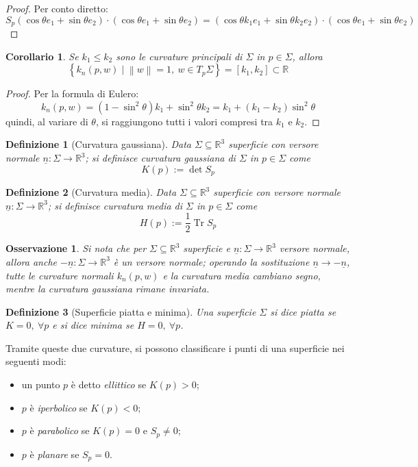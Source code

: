 \documentclass[12pt]{scrartcl}
\theoremstyle{style}
\newtheorem{definizione}{Definizione}[section]
\newtheorem{corollario}{Corollario}[teorema]
\newtheorem{osservazione}{Osservazione}[section]
\numberwithin{equation}{subsection}
\begin{document}
\begin{proof}
	Per conto diretto:
	\[
	S_p (\cos \theta  e_1 + \sin \theta e_2) \cdot (\cos \theta e_1 + \sin \theta e_2) = (\cos \theta k_1 e _1 + \sin \theta k_2 e_2) \cdot (\cos \theta e_1  +\sin \theta e_2)
	\] 
\end{proof}
\begin{corollario}
	Se $k_1 \le k_2$ sono le curvature principali di $\Sigma$ in $p \in \Sigma$, allora
	\[
		\left\{ k_n(p,w)  \mid \left\lVert w \right\rVert =1, \ w \in T_p\Sigma \right\}  = [k_1,k_2] \subset \mathbb{R}
	\] 
\end{corollario}
\begin{proof}
	Per la formula di Eulero:
	\[
	k_n(p,w) = (1- \sin ^2 \theta ) k_1 + \sin^2 \theta  k_2 = k_1 + (k_1-k_2)\sin^2 \theta 
	\] 
	quindi, al variare di $\theta $, si raggiungono tutti i valori compresi tra $k_1$ e $k_2$.
\end{proof}
\begin{definizione}
	[Curvatura gaussiana]
	Data $\Sigma \subseteq \mathbb{R}^3$ superficie con versore normale $\underline{n}:\Sigma \to \mathbb{R}^3$; si definisce \textit{curvatura gaussiana} di $\Sigma$ in $p \in \Sigma$ come
	\[
	K(p) := \det S_p
	\] 
\end{definizione}
\begin{definizione}
	[Curvatura media]
		Data $\Sigma \subseteq \mathbb{R}^3$ superficie con versore normale $\underline{n}:\Sigma \to \mathbb{R}^3$; si definisce \textit{curvatura media} di $\Sigma$ in $p \in \Sigma$ come
	\[
	H(p) := \frac{1}{2} \operatorname{Tr} S_p
\]
\end{definizione}
\begin{osservazione}
Si nota che per $\Sigma \subseteq \mathbb{R}^3$ superficie e $\underline{n} : \Sigma \to \mathbb{R}^3$ versore normale, allora anche $- \underline{n} :\Sigma \to \mathbb{R}^3$ \`e un versore normale; operando la sostituzione $\underline{n} \to - \underline{n}$, tutte le curvature normali $k_n (p,w)$ e la curvatura media cambiano segno, mentre la curvatura gaussiana rimane invariata.
\end{osservazione}
\begin{definizione}
	[Superficie piatta e minima]
	Una superficie $\Sigma$ si dice \textit{piatta} se $K = 0, \ \forall p$ e si dice \textit{minima} se $H = 0,\ \forall p$.
\end{definizione}
\noindent Tramite queste due curvature, si possono classificare i punti di una superficie nei seguenti modi:
\begin{itemize}
	\item un punto $p$ \`e detto \textit{ellittico} se $K(p) > 0$;
	\item $p$ \`e \textit{iperbolico} se $K(p) <0$;
	\item $p$ \`e \textit{parabolico}  se $K(p) = 0$ e $S_p \neq 0$;
	\item $p$ \`e \textit{planare} se $S_p = 0$.
\end{itemize}
\end{document}
